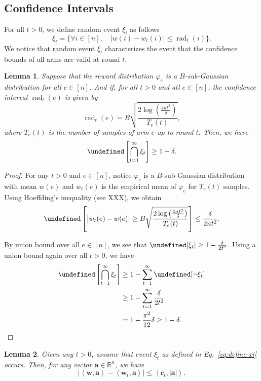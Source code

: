 \documentclass{article}
\newtheorem{lemma}{Lemma}
\newcommand{\Rew}{\varphi}
\newcommand{\RR}{\mathbb R}
\DeclareMathOperator{\rad}{rad}
\let\Pr\undefined
\DeclareMathOperator{\Pr}{Pr}
\newcommand{\inn}[1]{\left\langle #1 \right\rangle}
\renewcommand{\vec}[1]{\boldsymbol{#1}}
\begin{document}
\begin{spacing}{1.1}
\subsection{Confidence Intervals}

For all $t>0$, we define random event $\xi_t$ as follows
\begin{equation}
\xi_t = \Big\{
\forall i\in[n],\quad 
|w(i)-w_t(i)| \le \rad_t(i) 
\Big\}.
\label{eq:define-xi}
\end{equation}
We notice that random event $\xi_t$ characterizes the event that the confidence bounds of all arms are valid at round $t$.

\begin{lemma}
\label{lemma:ci}
Suppose that the reward distribution $\Rew_e$ is a $B$-sub-Gaussian distribution for all $e\in [n]$.
And if, for all $t>0$ and all $e\in [n]$, 
the confidence interval $\rad_t(e)$ is given by
$$
\rad_t(e) = B\sqrt{\frac{2\log\left(\frac{4n t^2}\delta\right)}{T_e(t)}},
$$
where $T_e(t)$ is the number of samples of arm $e$ up to round $t$.
Then, we have
$$
\Pr\left[\bigcap_{t=1}^\infty \xi_t \right] \ge 1-\delta.
$$
\end{lemma}

\begin{proof}
For any $t>0$ and $e\in [n]$, notice $\Rew_e$ is a $B$-sub-Gaussian distribution with mean $w(e)$ and $w_t(e)$ is the empirical mean of $\Rew_e$ for $T_e(t)$ samples. 
Using Hoeffding's inequality (see XXX), we obtain
$$
\Pr\left[ \big|w_t(e)-w(e) \big| \ge B\sqrt{\frac{2\log\left(\frac{4n t^2}\delta\right)}{T_e(t)}} \right] \le \frac{\delta}{2nt^2}.
$$

By union bound over all $e\in [n]$, we see that $\Pr[\xi_t] \ge 1-\frac{\delta}{2t^2}$. 
Using a union bound again over all $t>0$, we have
\begin{align*}
\Pr\left[\bigcap_{t=1}^\infty \xi_t \right] &\ge 1-\sum_{t=1}^\infty \Pr[\neg \xi_t]\\
&\ge 1-\sum_{t=1}^\infty \frac{\delta}{2t^2}\\
&= 1-\frac{\pi^2}{12}\delta \ge 1-\delta.
\end{align*}
\end{proof}


\begin{lemma}
\label{lemma:ci-property}
Given any $t>0$, assume that event $\xi_t$ as defined in Eq.~\eqref{eq:define-xi} occurs. 
Then, for any vector $\vec a \in \RR^n$, we have
$$
\big|\inn{\vec w,\vec a} - \inn{\vec w_t, \vec a}\big| \le \inn{\vec r_t, |\vec a|}.
$$
\end{lemma}


\end{spacing}
\end{document}
